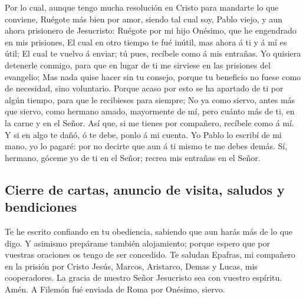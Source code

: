  Por lo cual, aunque tengo mucha resolución en Cristo para
mandarte lo que conviene,  Ruégote más bien por amor,
siendo tal cual soy, Pablo viejo, y aun ahora prisionero de Jesucristo:
 Ruégote por mi hijo Onésimo, que he engendrado en mis
prisiones,  El cual en otro tiempo te fué inútil, mas
ahora á ti y á mí es útil;  El cual te vuelvo á enviar;
tú pues, recíbele como á mis entrañas.  Yo quisiera
detenerle conmigo, para que en lugar de ti me sirviese en las prisiones
del evangelio;  Mas nada quise hacer sin tu consejo,
porque tu beneficio no fuese como de necesidad, sino voluntario.
 Porque acaso por esto se ha apartado de ti por algún
tiempo, para que le recibieses para siempre;  No ya como
siervo, antes más que siervo, como hermano amado, mayormente de mí, pero
cuánto más de ti, en la carne y en el Señor.  Así que, si
me tienes por compañero, recíbele como á mí.  Y si en
algo te dañó, ó te debe, ponlo á mi cuenta.  Yo Pablo lo
escribí de mi mano, yo lo pagaré: por no decirte que aun á ti mismo te
me debes demás.  Sí, hermano, góceme yo de ti en el
Señor; recrea mis entrañas en el Señor.

\hypertarget{cierre-de-cartas-anuncio-de-visita-saludos-y-bendiciones}{%
\subsection{Cierre de cartas, anuncio de visita, saludos y
bendiciones}\label{cierre-de-cartas-anuncio-de-visita-saludos-y-bendiciones}}

 Te he escrito confiando en tu obediencia, sabiendo que
aun harás más de lo que digo.  Y asimismo prepárame
también alojamiento; porque espero que por vuestras oraciones os tengo
de ser concedido.  Te saludan Epafras, mi compañero en la
prisión por Cristo Jesús,  Marcos, Aristarco, Demas y
Lucas, mis cooperadores.  La gracia de nuestro Señor
Jesucristo sea con vuestro espíritu. Amén. A Filemón fué enviada de Roma
por Onésimo, siervo.
